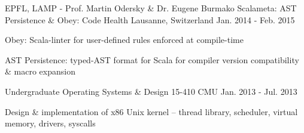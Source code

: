 \begin{cventries}

\cventry
{EPFL, LAMP - Prof. Martin Odersky \& Dr. Eugene Burmako}
{Scalameta: AST Persistence \& Obey: Code Health}
{Lausanne, Switzerland}
{Jan. 2014 - Feb. 2015}
{
	\begin{cvitems}
	\item{Obey: Scala-linter for user-defined rules enforced at compile-time}
  \item{AST Persistence: typed-AST format for Scala for compiler version compatibility \& macro expansion}
	\end{cvitems}
}

\cventry
{Undergraduate} %
{Operating Systems \& Design 15-410} %
{CMU} %
{Jan. 2013 - Jul. 2013} %
{ %
\begin{cvitems}
\item{Design \& implementation of x86 Unix kernel -- thread library, scheduler, virtual memory, drivers, syscalls}
\end{cvitems}
}

\end{cventries}
